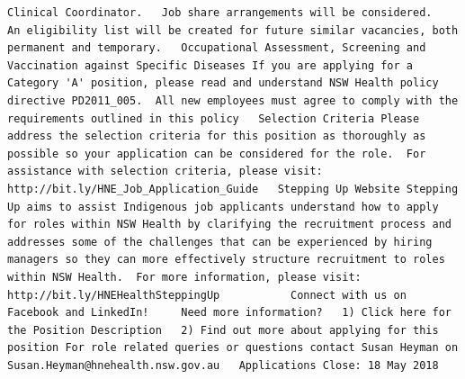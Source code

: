 \documentclass[11pt,a4paper,]{article}
\begin{document}
\begin{verbatim}
Clinical Coordinator.   Job share arrangements will be considered.     An eligibility list will be created for future similar vacancies, both permanent and temporary.   Occupational Assessment, Screening and Vaccination against Specific Diseases If you are applying for a Category 'A' position, please read and understand NSW Health policy directive PD2011_005.  All new employees must agree to comply with the requirements outlined in this policy   Selection Criteria Please address the selection criteria for this position as thoroughly as possible so your application can be considered for the role.  For assistance with selection criteria, please visit: http://bit.ly/HNE_Job_Application_Guide   Stepping Up Website Stepping Up aims to assist Indigenous job applicants understand how to apply for roles within NSW Health by clarifying the recruitment process and addresses some of the challenges that can be experienced by hiring managers so they can more effectively structure recruitment to roles within NSW Health.  For more information, please visit:  http://bit.ly/HNEHealthSteppingUp           Connect with us on Facebook and LinkedIn!     Need more information?   1) Click here for the Position Description   2) Find out more about applying for this position For role related queries or questions contact Susan Heyman on Susan.Heyman@hnehealth.nsw.gov.au   Applications Close: 18 May 2018          

\end{verbatim}
\end{document}
